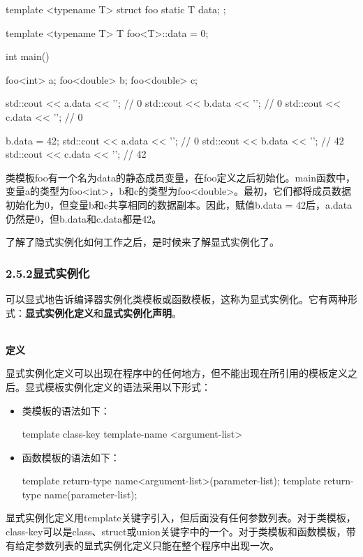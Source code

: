 \begin{cpp}
template <typename T>
struct foo
{
	static T data;
};

template <typename T> T foo<T>::data = 0;

int main()
{
	foo<int> a;
	foo<double> b;
	foo<double> c;
	
	std::cout << a.data << '\n'; // 0
	std::cout << b.data << '\n'; // 0
	std::cout << c.data << '\n'; // 0
	
	b.data = 42;
	std::cout << a.data << '\n'; // 0
	std::cout << b.data << '\n'; // 42
	std::cout << c.data << '\n'; // 42
}
\end{cpp}

类模板foo有一个名为data的静态成员变量，在foo定义之后初始化。main函数中，变量a的类型为foo<int>，b和c的类型为foo<double>。最初，它们都将成员数据初始化为0，但变量b和c共享相同的数据副本。因此，赋值b.data = 42后，a.data仍然是0，但b.data和c.data都是42。

了解了隐式实例化如何工作之后，是时候来了解显式实例化了。

\subsubsection{2.5.2\hspace{0.2cm}显式实例化}

可以显式地告诉编译器实例化类模板或函数模板，这称为显式实例化。它有两种形式：\textbf{显式实例化定义}和\textbf{显式实例化声明}。


\hspace*{\fill} \\ %
\noindent\textbf{定义}

显式实例化定义可以出现在程序中的任何地方，但不能出现在所引用的模板定义之后。显式模板实例化定义的语法采用以下形式：

\begin{itemize}
\item 
类模板的语法如下：
\begin{cpp}
template class-key template-name <argument-list>
\end{cpp}

\item 
函数模板的语法如下：
\begin{cpp}
template return-type name<argument-list>(parameter-list);
template return-type name(parameter-list);
\end{cpp}
\end{itemize}

显式实例化定义用template关键字引入，但后面没有任何参数列表。对于类模板，class-key可以是class、struct或union关键字中的一个。对于类模板和函数模板，带有给定参数列表的显式实例化定义只能在整个程序中出现一次。

